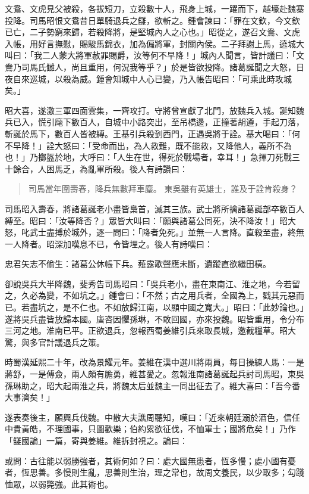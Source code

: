 文鴦、文虎見父被殺，各拔短刀，立殺數十人，飛身上城，一躍而下，越壕赴魏寨投降。司馬昭恨文鴦昔日單騎退兵之讎，欲斬之。鍾會諫曰：「罪在文欽，今文欽已亡，二子勢窮來歸，若殺降將，是堅城內人之心也。」昭從之，遂召文鴦、文虎入帳，用好言撫慰，賜駿馬錦衣，加為偏將軍，封關內侯。二子拜謝上馬，遶城大叫曰：「我二人蒙大將軍赦罪賜爵，汝等何不早降！」城內人聞言，皆計議曰：「文鴦乃司馬氏讎人，尚且重用，何況我等乎？」於是皆欲投降。諸葛誕聞之大怒，日夜自來巡城，以殺為威。鍾會知城中人心已變，乃入帳告昭曰：「可乘此時攻城矣。」

昭大喜，遂激三軍四面雲集，一齊攻打。守將曾宣獻了北門，放魏兵入城。誕知魏兵已入，慌引麾下數百人，自城中小路突出，至吊橋邊，正撞著胡遵，手起刀落，斬誕於馬下，數百人皆被縛。王基引兵殺到西門，正遇吳將于詮。基大喝曰：「何不早降！」詮大怒曰：「受命而出，為人救難，既不能救，又降他人，義所不為也！」乃擲盔於地，大呼曰：「人生在世，得死於戰場者，幸耳！」急揮刀死戰三十餘合，人困馬乏，為亂軍所殺。後人有詩讚曰：

\begin{quote}
司馬當年圍壽春，降兵無數拜車塵。
東吳雖有英雄士，誰及于詮肯殺身？
\end{quote}

司馬昭入壽春，將諸葛誕老小盡皆梟首，滅其三族。武士將所擒諸葛誕部卒數百人縛至。昭曰：「汝等降否？」眾皆大叫曰：「願與諸葛公同死，決不降汝！」昭大怒，叱武士盡搏於城外，逐一問曰：「降者免死。」並無一人言降。直殺至盡，終無一人降者。昭深加嘆息不已，令皆埋之。後人有詩嘆曰：

忠君矢志不偷生：諸葛公休帳下兵。薤露歌聲應未斷，遺蹤直欲繼田橫。

卻說吳兵大半降魏，斐秀告司馬昭曰：「吳兵老小，盡在東南江、淮之地，今若留之，久必為變，不如坑之。」鍾會曰：「不然；古之用兵者，全國為上，戳其元惡而已。若盡坑之，是不仁也。不如放歸江南，以顯中國之寬大。」昭曰：「此妙論也。」遂將吳兵盡皆放歸本國。唐咨因懼孫琳，不敢回國，亦來投魏。昭皆重用，令分布三河之地。淮南已平。正欲退兵，忽報西蜀姜維引兵來取長城，邀截糧草。昭大驚，與多官計議退兵之策。

時蜀漢延熙二十年，改為景耀元年。姜維在漢中選川將兩員，每日操練人馬：一是蔣舒，一是傅僉，兩人頗有膽勇，維甚愛之。忽報淮南諸葛誕起兵討司馬昭，東吳孫琳助之，昭大起兩淮之兵，將魏太后並魏主一同出征去了。維大喜曰：「吾今番大事濟矣！」

遂表奏後主，願興兵伐魏。中散大夫譙周聽知，嘆曰：「近來朝廷溺於酒色，信任中貴黃皓，不理國事，只圖歡樂；伯約累欲征伐，不恤軍士；國將危矣！」乃作「讎國論」一篇，寄與姜維。維拆封視之。論曰：

或問：古往能以弱勝強者，其術何如？曰：處大國無患者，恆多慢；處小國有憂者，恆思善。多慢則生亂，思善則生治，理之常也，故周文養民，以少取多；勾踐恤眾，以弱斃強。此其術也。

